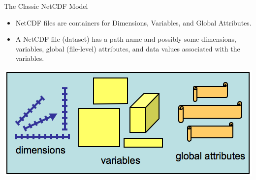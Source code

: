 \documentclass[compress,11pt,xcolor=svgnames,aspectratio=169]{beamer}
\begin{document}
\begin{frame}[fragile]{The Classic NetCDF Model}

\begin{itemize}
\setlength\itemsep{0.4cm}

  \item NetCDF files are containers for Dimensions, Variables, and Global Attributes.

  \item A NetCDF file (dataset) has a path name and possibly some dimensions, variables, global (file-level) attributes, and data values associated with the variables.\\[0.4cm]

\end{itemize}

\begin{center}
\includegraphics[scale=0.6]{fig/netcdf-classic}
\end{center}

\nocite{netcdf}

\end{frame}
\end{document}
